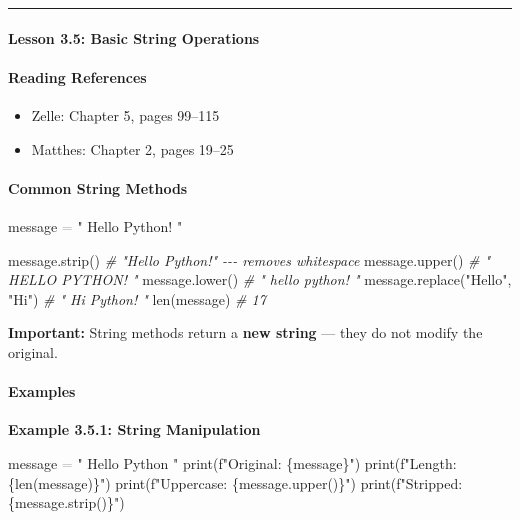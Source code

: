 \documentclass[
  justified,
  openright,
]{tufte-book}
\let\subsection\paragraph
\let\paragraph\paragraph
\newcommand{\StringTok}[1]{\textcolor{CodeString}{#1}}              %
\newcommand{\CommentTok}[1]{\textcolor{CodeComment}{\textit{#1}}}  %
\newcommand{\OperatorTok}[1]{\textcolor{DarkGray}{#1}}              %
\newenvironment{Shaded}{%
  \begin{mdframed}[style=TufteCode]%
}{%
  \end{mdframed}%
}
\let\subsection\paragraph
\let\paragraph\paragraph
\providecommand{\tightlist}{%
  \setlength{\itemsep}{0pt}\setlength{\parskip}{0pt}}
\begin{document}
\begin{center}\rule{0.5\linewidth}{0.5pt}\end{center}

\subsection{Lesson 3.5: Basic String
Operations}\label{lesson-3.5-basic-string-operations}

\subsection{Reading References}\label{reading-references-16}

\begin{itemize}
\tightlist
\item
  Zelle: Chapter 5, pages 99--115
\item
  Matthes: Chapter 2, pages 19--25
\end{itemize}

\subsection{Common String Methods}\label{common-string-methods}

\begin{Shaded}
\begin{Highlighting}[]
message \OperatorTok{=} \StringTok{"  Hello Python!  "}
 
message.strip()          \CommentTok{\# "Hello Python!"   {-}{-}{-} removes whitespace}
message.upper()          \CommentTok{\# "  HELLO PYTHON!  "}
message.lower()          \CommentTok{\# "  hello python!  "}
message.replace(\StringTok{"Hello"}, \StringTok{"Hi"})  \CommentTok{\# "  Hi Python!  "}
len(message)             \CommentTok{\# 17}
\end{Highlighting}
\end{Shaded}

\textbf{Important:} String methods return a \textbf{new string} --- they
do not modify the original.

\subsection{Examples}\label{examples-9}

\textbf{Example 3.5.1: String Manipulation}

\begin{Shaded}
\begin{Highlighting}[]
message \OperatorTok{=} \StringTok{"  Hello Python  "}
print(\StringTok{f"Original: \textquotesingle{}}\StringTok{\{}message\StringTok{\}}\StringTok{\textquotesingle{}"})
print(\StringTok{f"Length: }\StringTok{\{}len(message)\StringTok{\}}\StringTok{"})
print(\StringTok{f"Uppercase: \textquotesingle{}}\StringTok{\{}message\StringTok{.}upper()\StringTok{\}}\StringTok{\textquotesingle{}"})
print(\StringTok{f"Stripped: \textquotesingle{}}\StringTok{\{}message\StringTok{.}strip()\StringTok{\}}\StringTok{\textquotesingle{}"})
\end{Highlighting}
\end{Shaded}
\end{document}
